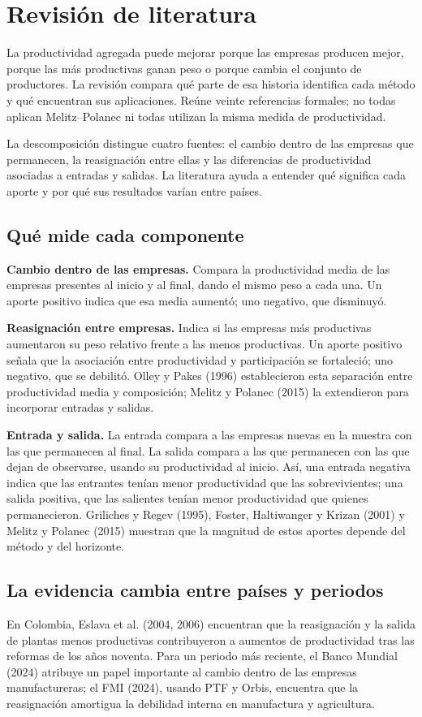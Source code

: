 \section{Revisión de literatura}
La productividad agregada puede mejorar porque las empresas producen mejor, porque las más productivas ganan peso o porque cambia el conjunto de productores. La revisión compara qué parte de esa historia identifica cada método y qué encuentran sus aplicaciones. Reúne veinte referencias formales; no todas aplican Melitz--Polanec ni todas utilizan la misma medida de productividad.

La descomposición distingue cuatro fuentes: el cambio dentro de las empresas que permanecen, la reasignación entre ellas y las diferencias de productividad asociadas a entradas y salidas. La literatura ayuda a entender qué significa cada aporte y por qué sus resultados varían entre países.

\subsection{Qué mide cada componente}
\textbf{Cambio dentro de las empresas.} Compara la productividad media de las empresas presentes al inicio y al final, dando el mismo peso a cada una. Un aporte positivo indica que esa media aumentó; uno negativo, que disminuyó.

\textbf{Reasignación entre empresas.} Indica si las empresas más productivas aumentaron su peso relativo frente a las menos productivas. Un aporte positivo señala que la asociación entre productividad y participación se fortaleció; uno negativo, que se debilitó. Olley y Pakes (1996) establecieron esta separación entre productividad media y composición; Melitz y Polanec (2015) la extendieron para incorporar entradas y salidas.

\textbf{Entrada y salida.} La entrada compara a las empresas nuevas en la muestra con las que permanecen al final. La salida compara a las que permanecen con las que dejan de observarse, usando su productividad al inicio. Así, una entrada negativa indica que las entrantes tenían menor productividad que las sobrevivientes; una salida positiva, que las salientes tenían menor productividad que quienes permanecieron. Griliches y Regev (1995), Foster, Haltiwanger y Krizan (2001) y Melitz y Polanec (2015) muestran que la magnitud de estos aportes depende del método y del horizonte.

\subsection{La evidencia cambia entre países y periodos}
En Colombia, Eslava et al. (2004, 2006) encuentran que la reasignación y la salida de plantas menos productivas contribuyeron a aumentos de productividad tras las reformas de los años noventa. Para un periodo más reciente, el Banco Mundial (2024) atribuye un papel importante al cambio dentro de las empresas manufactureras; el FMI (2024), usando PTF y Orbis, encuentra que la reasignación amortigua la debilidad interna en manufactura y agricultura.

